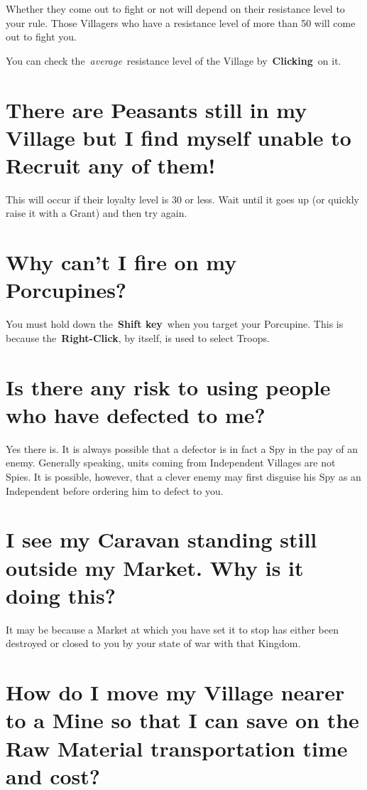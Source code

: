 Whether they come out to fight or not will depend on their resistance level to your rule. Those Villagers who have a resistance level of more than 50 will come out to fight you.

You can check the \textit{average} resistance level of the Village by \textbf{Clicking} on it.

\section{There are Peasants still in my Village but I find myself unable to Recruit any of them!}

This will occur if their loyalty level is 30 or less. Wait until it goes up (or quickly raise it with a Grant) and then try again.

\section{Why can’t I fire on my Porcupines?}

You must hold down the \textbf{Shift key} when you target your Porcupine. This is because the \textbf{Right-Click}, by itself, is used to select Troops.

\section{Is there any risk to using people who have defected to me?}

Yes there is. It is always possible that a defector is in fact a Spy in the pay of an enemy. Generally speaking, units coming from Independent Villages are not Spies. It is possible, however, that a clever enemy may first disguise his Spy as an Independent before ordering him to defect to you.

\section{I see my Caravan standing still outside my Market. Why is it doing this?}

It may be because a Market at which you have set it to stop has either been destroyed or closed to you by your state of war with that Kingdom.

\section{How do I move my Village nearer to a Mine so that I can save on the Raw Material transportation time and cost?}


